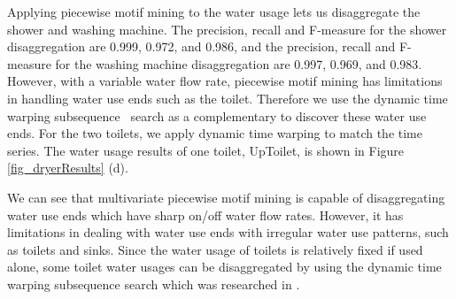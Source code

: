 %
Applying piecewise motif mining to the water usage lets us disaggregate the
shower and washing machine. %
The precision, recall and F-measure for the shower disaggregation are 
0.999, 0.972, and 0.986,  
and the precision, recall and F-measure for the washing machine disaggregation are 
0.997, 0.969, and 0.983. 
However, with a variable water flow rate, 
piecewise motif mining has limitations in handling water use ends such as the toilet.
Therefore we use the dynamic time warping subsequence~\cite{rakthanmanon2012searching} search as a complementary to discover these water use ends.  
For the two toilets, we apply dynamic time warping to match the time series.
The water usage results of one toilet, UpToilet, is shown in Figure \ref{fig_dryerResults} (d). 

We can see that multivariate piecewise motif mining is capable of 
disaggregating water use ends which have sharp on/off water flow rates. 
However, it has limitations in dealing with water use ends with irregular water use patterns, 
such as toilets and sinks. 
Since the water usage of toilets is relatively fixed if used alone, 
some toilet water usages can be disaggregated by using the dynamic time warping subsequence search 
which was researched in \cite{nguyen2013development}. 
\fi

